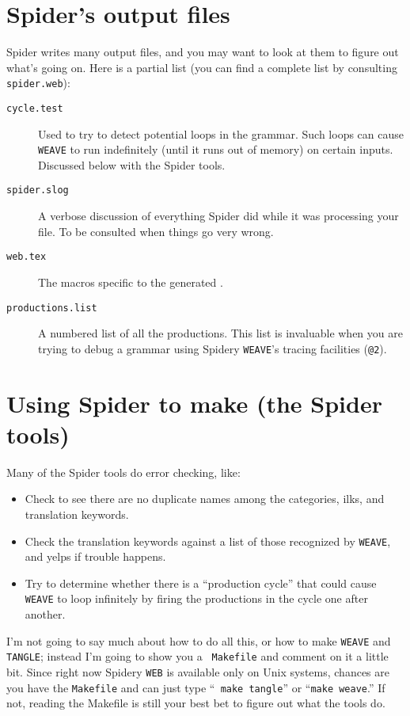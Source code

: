 \section{{Spider}'s output files}
{Spider} writes many output files, and you may want to look at
them to figure out what's going on.
Here is a partial list (you can find a complete list by consulting
{\tt spider.web}):
\begin{description}
\item[\tt cycle.test]
Used to try to detect potential loops in the grammar.
Such loops can cause {\tt WEAVE} to run indefinitely (until it runs
out of memory) on certain inputs.
Discussed below with the {Spider} tools.
\item[\tt spider.slog]
A verbose discussion of everything {Spider} did while it was
processing your file.
To be consulted when things go very wrong.
\item[\tt *web.tex]
The macros specific to the generated {\WEB}.
\item[\tt productions.list]
A numbered list of all the productions.
This list is invaluable when you are trying to debug a grammar using
Spidery {\tt WEAVE}'s tracing facilities ({\tt @2}).
\end{description}




\section{Using {Spider} to make {\WEB} (the {Spider} tools)}
Many of the {Spider} tools do error checking, like:
\begin{itemize}
\item
Check to see there are no duplicate names among the categories, ilks,
and translation keywords.
\item
Check the translation keywords against a list of those recognized by
{\tt WEAVE}, and yelps if trouble happens.
\item
Try to determine whether there is a ``production cycle'' that could
cause {\tt WEAVE} to loop infinitely by firing the productions in the
cycle one after another.
\end{itemize}

I'm not going to say much about how to do all this, or how to make
{\tt WEAVE} and {\tt TANGLE}; instead I'm going to show you a {\tt
Makefile} and comment on it a little bit.
Since right now Spidery {\tt WEB} is available only on Unix systems,
chances are you have the {\tt Makefile} and can just type ``{\tt
make~tangle}'' or ``{\tt make~weave}.'' 
If not, reading the Makefile is still your best bet to figure out what
the tools do.

